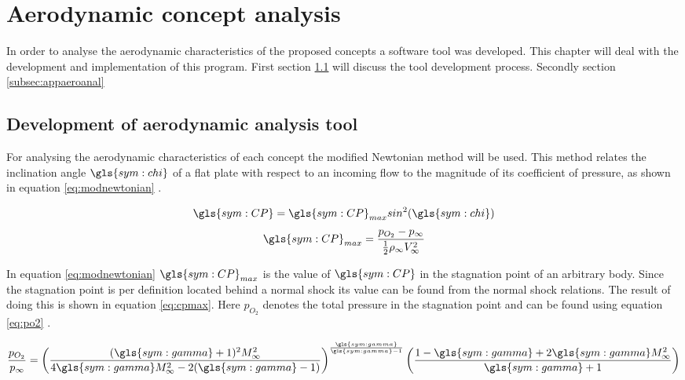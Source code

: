 \section{Aerodynamic concept analysis}
\label{ch:aero_analysis}
In order to analyse the aerodynamic characteristics of the proposed concepts a software tool was developed. This chapter will deal with the development and implementation of this program. First section \ref{subsec:aerotool} will discuss the tool development process. Secondly section \ref{subsec:appaeroanal} 

\subsection{Development of aerodynamic analysis tool}
\label{subsec:aerotool}
For analysing the aerodynamic characteristics of each concept the modified Newtonian method will be used. This method relates the inclination angle $\gls{sym:chi}$ of a flat plate with respect to an incoming flow to the magnitude of its coefficient of pressure, as shown in equation \ref{eq:modnewtonian} \cite{AndersonJr.2006}.
\begin{multicols}{2}
\begin{equation}
\gls{sym:CP}=\gls{sym:CP}_{max}sin^{2}(\gls{sym:chi})
\label{eq:modnewtonian}
\end{equation} \break
\begin{equation}
\gls{sym:CP}_{max}=\frac{p_{O_{2}}-p_{\infty}}{\frac{1}{2}\rho_{\infty}V_{\infty}^{2}}
\label{eq:cpmax}
\end{equation}
\end{multicols}
In equation \ref{eq:modnewtonian} $\gls{sym:CP}_{max}$ is the value of $\gls{sym:CP}$ in the stagnation point of an arbitrary body. Since the stagnation point is per definition located behind a normal shock its value can be found from the normal shock relations. The result of doing this is shown in equation \ref{eq:cpmax}. Here $p_{O_{2}}$ denotes the total pressure in the stagnation point and can be found using equation \ref{eq:po2} \cite{AndersonJr.2007}.

\begin{equation}
\frac{p_{O_{2}}}{p_{\infty}}=\left(\frac{(\gls{sym:gamma}+1)^{2}M_{\infty}^{2}}{4\gls{sym:gamma} M_{\infty}^{2}-2(\gls{sym:gamma}-1)}\right)^{\frac{\gls{sym:gamma}}{\gls{sym:gamma}-1}}\left(\frac{1-\gls{sym:gamma}+2\gls{sym:gamma} M_{\infty}^{2}}{\gls{sym:gamma}+1}\right)
\label{eq:po2}
\end{equation}

